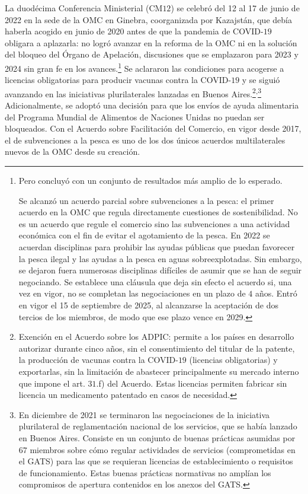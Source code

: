 \documentclass[10pt,a4paper]{article}
\newcounter{anexo}
\begin{document}
La duodécima Conferencia Ministerial (CM$12$) se celebró del 12 al 17 de junio de 2022 en la sede de la OMC en Ginebra, coorganizada por Kazajstán, que debía haberla acogido en junio de 2020 antes de que la pandemia de COVID-$19$ obligara a aplazarla: no logró avanzar en la reforma de la OMC ni en la solución del bloqueo del Órgano de Apelación, discusiones que se emplazaron para 2023 y 2024 sin gran fe en los avances.\footnote{%
    Pero concluyó con un conjunto de resultados más amplio de lo esperado. 
    
    Se alcanzó un acuerdo parcial sobre subvenciones a la pesca: el primer acuerdo en la OMC que regula directamente cuestiones de sostenibilidad. No es un acuerdo que regule el comercio sino las subvenciones a una actividad económica con el fin de evitar el agotamiento de la pesca. En 2022 se acuerdan disciplinas para prohibir las ayudas públicas que puedan favorecer la pesca ilegal y las ayudas a la pesca en aguas sobreexplotadas. Sin embargo, se dejaron fuera numerosas disciplinas difíciles de asumir que se han de seguir negociando. Se establece una cláusula que deja sin efecto el acuerdo si, una vez en vigor, no se completan las negociaciones en un plazo de $4$ años. Entró en vigor el 15 de septiembre de 2025, al alcanzarse la aceptación de dos tercios de los miembros, de modo que ese plazo vence en 2029.
} Se aclararon las condiciones para acogerse a licencias obligatorias para producir vacunas contra la COVID-$19$ y se siguió avanzando en las iniciativas plurilaterales lanzadas en Buenos Aires.\footnote{%
    Exención en el Acuerdo sobre los ADPIC: permite a los países en desarrollo autorizar durante cinco años, sin el consentimiento del titular de la patente, la producción de vacunas contra la COVID-$19$ (licencias obligatorias) y exportarlas, sin la limitación de abastecer principalmente su mercado interno que impone el art. $31$.f) del Acuerdo. Estas licencias permiten fabricar sin licencia un medicamento patentado en casos de necesidad.
}\textsuperscript{,}\footnote{%
    En diciembre de 2021 se terminaron las negociaciones de la iniciativa plurilateral de reglamentación nacional de los servicios, que se había lanzado en Buenos Aires. Consiste en un conjunto de buenas prácticas asumidas por $67$ miembros sobre cómo regular actividades de servicios (comprometidas en el GATS) para las que se requieran licencias de establecimiento o requisitos de funcionamiento. Estas buenas prácticas normativas no amplían los compromisos de apertura contenidos en los anexos del GATS.
} Adicionalmente, se adoptó una decisión para que los envíos de ayuda alimentaria del Programa Mundial de Alimentos de Naciones Unidas no puedan ser bloqueados. Con el Acuerdo sobre Facilitación del Comercio, en vigor desde 2017, el de subvenciones a la pesca es uno de los dos únicos acuerdos multilaterales nuevos de la OMC desde su creación.
\end{document}
